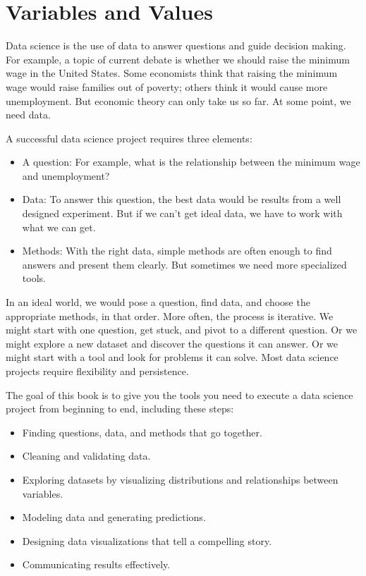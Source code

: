 \hypertarget{variables-and-values}{%
\chapter{Variables and Values}\label{variables-and-values}}

Data science is the use of data to answer questions and guide decision
making. For example, a topic of current debate is whether we should
raise the minimum wage in the United States. Some economists think that
raising the minimum wage would raise families out of poverty; others
think it would cause more unemployment. But economic theory can only
take us so far. At some point, we need data.

A successful data science project requires three elements:

\begin{itemize}
\item
  A question: For example, what is the relationship between the minimum
  wage and unemployment?
\item
  Data: To answer this question, the best data would be results from a
  well designed experiment. But if we can't get ideal data, we have to
  work with what we can get.
\item
  Methods: With the right data, simple methods are often enough to find
  answers and present them clearly. But sometimes we need more
  specialized tools.
\end{itemize}

In an ideal world, we would pose a question, find data, and choose the
appropriate methods, in that order. More often, the process is
iterative. We might start with one question, get stuck, and pivot to a
different question. Or we might explore a new dataset and discover the
questions it can answer. Or we might start with a tool and look for
problems it can solve. Most data science projects require flexibility
and persistence.

The goal of this book is to give you the tools you need to execute a
data science project from beginning to end, including these steps:

\begin{itemize}
\item
  Finding questions, data, and methods that go together.
\item
  Cleaning and validating data.
\item
  Exploring datasets by visualizing distributions and relationships
  between variables.
\item
  Modeling data and generating predictions.
\item
  Designing data visualizations that tell a compelling story.
\item
  Communicating results effectively.
\end{itemize}

